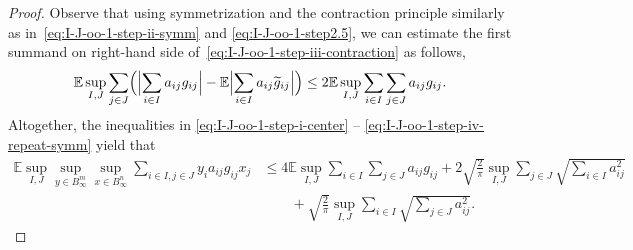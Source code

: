 \documentclass[a4paper]{amsart}
\theoremstyle{definition}
\theoremstyle{remark}
\numberwithin{equation}{section}
\newcommand*{\EE}{\mathbb{E}}
\begin{document}
\begin{proof}
Observe that using symmetrization and the contraction principle similarly as in~\eqref{eq:I-J-oo-1-step-ii-symm} and \eqref{eq:I-J-oo-1-step2.5}, we can estimate the first summand on right-hand side of~\eqref{eq:I-J-oo-1-step-iii-contraction}
as follows,
 \begin{equation}	
	 \EE \sup_{I, J}  \sum_{j\in J} \Bigl( \Bigl| \sum_{i\in I} a_{ij} g_{ij} \Bigr|  - \EE  \Bigl| \sum_{i\in I} a_{ij} \widetilde{g}_{ij}  \Bigr|\Bigr)
	 \leq 	2 \EE \sup_{I, J} \sum_{i\in I} \sum_{j\in J} a_{ij} g_{ij}.
	\label{eq:I-J-oo-1-step-iv-repeat-symm}
\end{equation}
Altogether, the inequalities in \eqref{eq:I-J-oo-1-step-i-center} -- \eqref{eq:I-J-oo-1-step-iv-repeat-symm} yield that
	\begin{align}	
		\EE \sup_{I, J} \sup_{y\in B_\infty^m}\sup_{x\in B_\infty^n}
		\sum_{i\in I, j\in J} y_i a_{ij} g_{ij} x_j
		&\leq 4 \EE \sup_{I, J} \sum_{i\in I} \sum_{j\in J} a_{ij} g_{ij}
		 + 2 \sqrt{\frac{2}{\pi}} \sup_{I, J} \sum_{j\in J} \sqrt{\sum_{i\in I} a_{ij}^2} \nonumber\\
		 &\qquad  + \sqrt{\frac{2}{\pi}}\sup_{I, J}  \sum_{i\in I} \sqrt{\sum_{j\in J} a_{ij}^2 } .
    \label{eq:I-J-oo-1-step-v-sumup}
	\end{align}


\end{proof}
\end{document}
